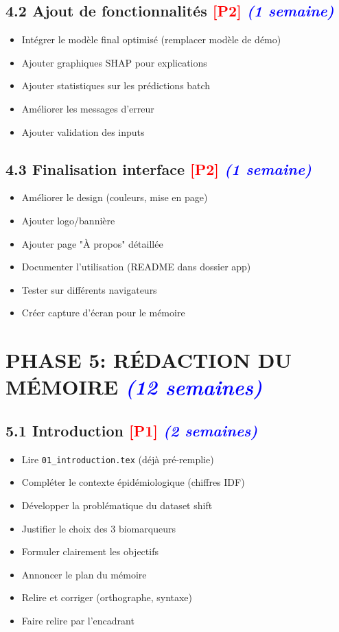 \documentclass[a4paper,11pt]{article}
\newcommand{\checkbox}{\large$\square$}
\newcommand{\priorite}[1]{\textcolor{red}{\textbf{[#1]}}}
\newcommand{\duree}[1]{\textcolor{blue}{\textit{(#1)}}}
\begin{document}
\subsection*{4.2 Ajout de fonctionnalités \priorite{P2} \duree{1 semaine}}

\begin{itemize}[label=\checkbox]
    \item Intégrer le modèle final optimisé (remplacer modèle de démo)
    \item Ajouter graphiques SHAP pour explications
    \item Ajouter statistiques sur les prédictions batch
    \item Améliorer les messages d'erreur
    \item Ajouter validation des inputs
\end{itemize}

\subsection*{4.3 Finalisation interface \priorite{P2} \duree{1 semaine}}

\begin{itemize}[label=\checkbox]
    \item Améliorer le design (couleurs, mise en page)
    \item Ajouter logo/bannière
    \item Ajouter page "À propos" détaillée
    \item Documenter l'utilisation (README dans dossier app)
    \item Tester sur différents navigateurs
    \item Créer capture d'écran pour le mémoire
\end{itemize}

\newpage

\section*{PHASE 5: RÉDACTION DU MÉMOIRE \duree{12 semaines}}

\subsection*{5.1 Introduction \priorite{P1} \duree{2 semaines}}

\begin{itemize}[label=\checkbox]
    \item Lire \texttt{01\_introduction.tex} (déjà pré-remplie)
    \item Compléter le contexte épidémiologique (chiffres IDF)
    \item Développer la problématique du dataset shift
    \item Justifier le choix des 3 biomarqueurs
    \item Formuler clairement les objectifs
    \item Annoncer le plan du mémoire
    \item Relire et corriger (orthographe, syntaxe)
    \item Faire relire par l'encadrant
\end{itemize}
\end{document}
